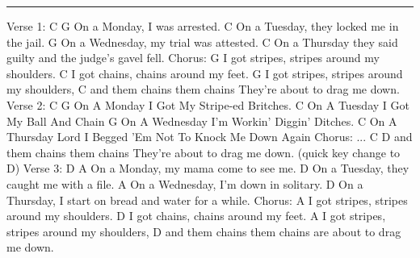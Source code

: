 \noindent\rule{\columnwidth}{1pt}

\begin{lstsong}
Verse 1:
       C               G
On a Monday, I was arrested. 
                                    C
On a Tuesday, they locked me in the jail.
                               G
On a Wednesday, my trial was attested. 
                                                     C
On a Thursday they said guilty and the judge's gavel fell.
Chorus:
                                  G
I got stripes, stripes around my shoulders.
                                C
I got chains, chains around my feet.
                                   G
I got stripes, stripes around my shoulders,
                                                     C
and them chains them chains They're about to drag me down.
Verse 2:
     C                         G
On A Monday I Got My Stripe-ed Britches. 
                               C
On A Tuesday I Got My Ball And Chain
                                   G
On A Wednesday I'm Workin' Diggin' Ditches. 
                                                     C
On A Thursday Lord I Begged 'Em Not To Knock Me Down Again
Chorus: ...
                                                     C     D
and them chains them chains They're about to drag me down. (quick key change to D)
Verse 3:
      D                      A
On a Monday, my mama come to see me. 
                                    D
On a Tuesday, they caught me with a file.
                            A
On a Wednesday, I'm down in solitary. 
                                                D
On a Thursday, I start on bread and water for a while.
Chorus:
                                  A
I got stripes, stripes around my shoulders.
                                D
I got chains, chains around my feet.
                                   A
I got stripes, stripes around my shoulders,
                                                 D
and them chains them chains are about to drag me down.
\end{lstsong}
\newpage

